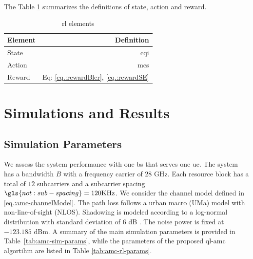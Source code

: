 The Table \ref{tab:ql-amc-def} summarizes the definitions of state, action and reward.

\begin{table}[htb]
\centering
\caption{\gls{rl} elements}
\label{tab:ql-amc-def}
\begin{tabularx}{0.55\columnwidth}{X r}
\toprule
\textbf{Element} 	      & \textbf{Definition} \\
\midrule
State                   & \gls{cqi} \\
Action                  & \gls{mcs} \\
Reward                  & Eq: \eqref{eq.:rewardBler}, \eqref{eq.:rewardSE} \\
\bottomrule
\end{tabularx}
\end{table}
%


\section{Simulations and Results}
\label{sec:amc-simulation}
\subsection{Simulation Parameters}
We assess the system performance with one \gls{bs} that serves one \gls{ue}.
%
The system has a bandwidth $B$ with a frequency carrier of $28$ GHz. Each resource block has a total of $12$ subcarriers and a subcarrier spacing $\gls{not:sub-spacing}= 120 \text{KHz}$.
%
We consider the channel model defined in \eqref{eq.:amc-channelModel}.
%
The path loss follows a urban macro (UMa) model with non-line-of-sight (NLOS). Shadowing is modeled according to a log-normal distribution with standard deviation of $6$ dB \cite{AliZaidi632018}.
%
The noise power is fixed at $-123.185$ dBm.
%
A summary of the main simulation parameters is provided in Table~\ref{tab:amc-sim-params}, while the parameters of the proposed \gls{ql-amc} algortihm are listed in Table \ref{tab:amc-rl-params}.


